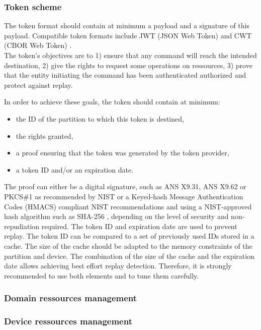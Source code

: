 \documentclass[conference]{IEEEtran}
\begin{document}
\subsubsection{Token scheme}
The token format should contain at minimum a payload and a signature of this payload. Compatible token formats include JWT (JSON Web Token) \cite{rfc7519_jwt_2015} and CWT (CBOR Web Token) \cite{rfc_CWT_2017}.\\

The token's objectives are to 1) ensure that any command will reach the intended destination, 2) give the rights to request some operations on ressources, 3) prove that the entity initiating the command has been authenticated authorized and protect against replay.

In order to achieve these goals, the token should contain at minimum:
\begin{itemize}
    \item the ID of the partition to which this token is destined,
    \item the rights granted,
    \item a proof ensuring that the token was generated by the token provider,
    \item a token ID and/or an expiration date.
\end{itemize}

The proof can either be a digital signature, such as ANS X9.31, ANS X9.62 or PKCS\#1 as recommended by NIST \cite{nist_dss_2013} or a Keyed-hash Message Authentication Codes (HMACS) compliant NIST recommendations and using a NIST-approved hash algorithm such as SHA-256 \cite{nist_hmac_2008, nist_hash_2012}, depending on the level of security and non-repudiation required.
The token ID and expiration date are used to prevent replay. The token ID can be compared to a set of previously used IDs stored in a cache. The size of the cache should be adapted to the memory constraints of the partition and device. The combination of the size of the cache and the expiration date allows achieving best effort replay detection. Therefore, it is strongly recommended to use both elements and to tune them carefully. 

\subsubsection{Domain ressources management}
\subsubsection{Device ressources management}
\end{document}

